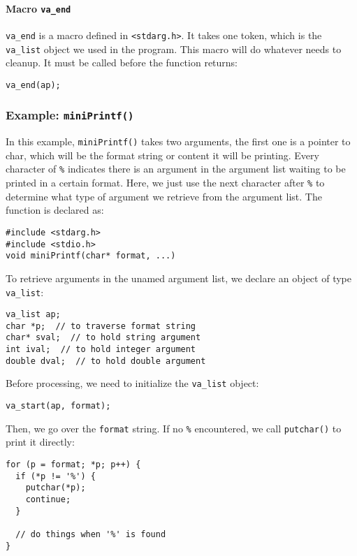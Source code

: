 \documentclass[12pt]{article}
\begin{document}
\paragraph{Macro \texttt{va\_end}}
\label{sec:orgc086f29}
\texttt{va\_end} is a macro defined in \texttt{<stdarg.h>}. It takes one token, which is the \texttt{va\_list} object we used in the program. This macro will do whatever needs to cleanup. It must be called before the function returns:
\begin{verbatim}
va_end(ap);
\end{verbatim}

\subsubsection{Example: \texttt{miniPrintf()} \label{org4bb8c28}}
\label{sec:org5638bbf}
In this example, \texttt{miniPrintf()} takes two arguments, the first one is a pointer to char, which will be the format string or content it will be printing. Every character of \texttt{\%} indicates there is an argument in the argument list waiting to be printed in a certain format. Here, we just use the next character after \texttt{\%} to determine what type of argument we retrieve from the argument list. The function is declared as:
\begin{verbatim}
#include <stdarg.h>
#include <stdio.h>
void miniPrintf(char* format, ...)
\end{verbatim}
To retrieve arguments in the unamed argument list, we declare an object of type \texttt{va\_list}:
\begin{verbatim}
va_list ap;
char *p;  // to traverse format string
char* sval;  // to hold string argument
int ival;  // to hold integer argument
double dval;  // to hold double argument
\end{verbatim}
Before processing, we need to initialize the \texttt{va\_list} object:
\begin{verbatim}
va_start(ap, format);
\end{verbatim}
Then, we go over the \texttt{format} string. If no \texttt{\%} encountered, we call \texttt{putchar()} to print it directly:
\begin{verbatim}
for (p = format; *p; p++) {
  if (*p != '%') {
    putchar(*p);
    continue;
  }

  // do things when '%' is found
}
\end{verbatim}
\end{document}
